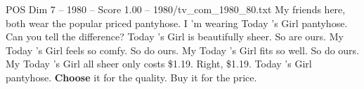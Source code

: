 \begin{textsample}{POS Dim 7 – 1980 – Score 1.00 – 1980/tv\_com\_1980\_80.txt}  \label{ex:f7_pos_047}
My friends here, both wear the popular priced pantyhose.
I 'm wearing Today 's Girl pantyhose.
Can you tell the difference?
Today 's Girl is beautifully sheer.
So are ours.
My Today 's Girl feels so comfy.
So do ours.
My Today 's Girl fits so well.
So do ours.
My Today 's Girl all sheer only costs \$1.19.
Right, \$1.19.
Today 's Girl pantyhose. \textbf{Choose} it for the quality.
Buy it for the price.

\end{textsample}
